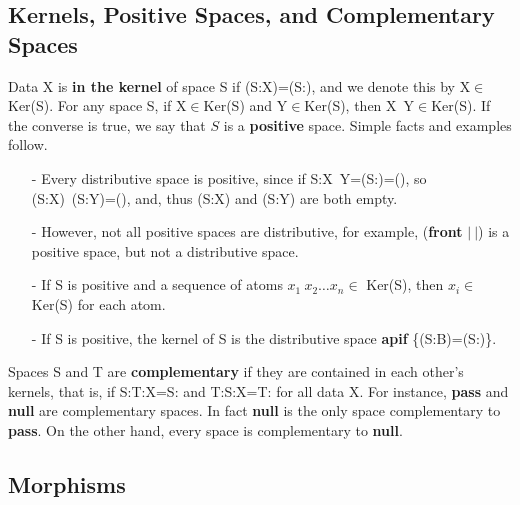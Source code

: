 \documentclass[11pt]{article}
\begin{document}
\subsection{Kernels, Positive Spaces, and Complementary Spaces}

Data X is {\bf in the kernel} of space S if (S:X)=(S:), and we denote this by X$\in $Ker(S).  For any space S, if X$\in $Ker(S) and Y$\in $Ker(S), then X\ Y$\in$Ker(S).  
If the converse is true, we say that $S$ is a {\bf positive} space.  Simple facts and examples follow.  
\begin{enumerate}
\item[-]{Every distributive space is positive, since if S:X\ Y=(S:)=(), so (S:X)\ (S:Y)=(), and, thus (S:X) and (S:Y) are both empty}.
\item[-]{However, not all positive spaces are distributive, for example, ({\bf front} $\vert\ \vert$) is a positive space, but not a distributive space}.
\item[-]{If S is positive and a sequence of atoms $x_1\ x_2\dots x_n\in$ Ker(S), then $x_i\in$ Ker(S) for each atom}.
\item[-]{If S is positive, the kernel of S is the distributive space {\bf apif} \{(S:B)=(S:)\}.}
\end{enumerate} 
Spaces S and T are {\bf complementary} if they are contained in each other's kernels, that is, if S:T:X=S: and T:S:X=T: for all data X.  For instance, {\bf pass} and {\bf null} are complementary spaces.  In fact {\bf null} is the only space complementary to {\bf pass}.  On the other hand, every space is complementary to {\bf null}.  

\subsection{Morphisms}
\end{document}
